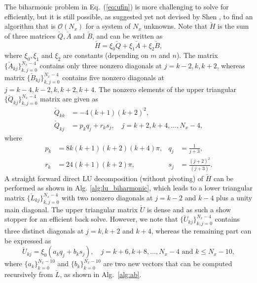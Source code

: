 \documentclass[preprint]{elsarticle}
\newcommand{\N}[1]{\check{#1}}
\begin{document}
The biharmonic problem in Eq.~(\ref{eq:ufin}) is more challenging to solve for efficiently, but 
it is still possible, as suggested yet not devised by Shen \cite{Shen95}, to find an algorithm that is $\mathcal{O}(N_x)$ for a system of $N_x$ unknowns. Note 
that $\N{H}$ is the sum of three matrices $\N{Q}, \N{A}$ and $\N{B}$, and can be 
written as
\begin{equation}
\N{H} = \xi_0\N{Q} + \xi_1\N{A} + \xi_2 \N{B},
\end{equation}
where $\xi_0, \xi_1$ and $\xi_2$ are constants (depending on $m$ and $n$). The matrix $\{\N{A}_{kj}\}_{k,j=0}^{N_x-4}$ contains only 
three nonzero diagonals at $ j = k-2, k, k+2$,  whereas matrix $\{\N{B}_{kj}\}_{k,j=0}^{N_x-4}$ 
contains five 
nonzero diagonals at $ j = k-4, k-2, k, k+2, k+4$. The nonzero elements of the 
upper triangular $\{\N{Q}_{kj}\}_{k,j=0}^{N_x-4}$ matrix are given as \cite{Shen95}
\begin{align}
\label{eq:N_Q}
 \N{Q}_{kk} &= -4(k+1)(k+2)^2, \\
 \N{Q}_{kj} &= p_kq_j + r_ks_j, \quad j = k+2, k+4, \ldots, N_x-4,
\end{align}
where 
\begin{align}
p_k &= 8 k (k+1)(k+2)(k+4)\pi, &q_j &= \frac{1}{j+3}, \label{eq:pk} \\
r_k &= 24(k+1)(k+2)\pi, &s_j &=  \frac{(j+2)^2}{(j+3)}. \label{eq:rk}
\end{align} 
A straight forward direct LU decomposition (without pivoting) of $\N{H}$ can be performed as shown in Alg. 
\ref{alg:lu_biharmonic}, which leads to a lower 
triangular 
matrix $\{\N{L}_{kj}\}_{k,j=0}^{N_x-4}$ with two nonzero diagonals at $j=k-2$ and $k-4$ plus a unity 
main diagonal. The upper triangular matrix $\N{U}$ is dense and as such a 
show stopper for an efficient back solve. However, we note that $\{\N{U}_{kj}\}_{k,j=0}^{N_x-4}$ 
contains three distinct diagonals at $j=k, k+2$ and $k+4$, whereas the remaining part can be expressed as
\begin{equation}
\N{U}_{kj} = \xi_0(a_k q_j + b_k s_j), \quad j = k+6, k+8, \ldots, N_x-4 \text{ and } k\le N_x-10, 
\label{eq:ab}
\end{equation}
where $\{a_k\}_{k=0}^{N_x-10}$ and $\{b_k\}_{k=0}^{N_x-10}$ are two new 
vectors that can be computed recursively from $\N{L}$, as shown in Alg.~\ref{alg:ab}. 
\end{document}
